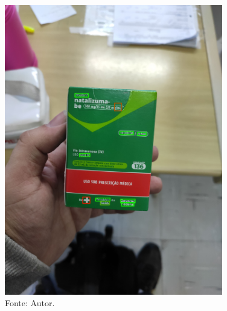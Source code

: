 \begin{frame}
\begin{columns}
\begin{column}{0.5\textwidth}
\begin{figure}
				\includegraphics[width=0.85\textwidth]{../pictures/tysabri_rgb_boxes.jpg}
				\caption*{Fonte: Autor.}
			\end{figure}
		\end{column}
	\end{columns}
\end{frame}

